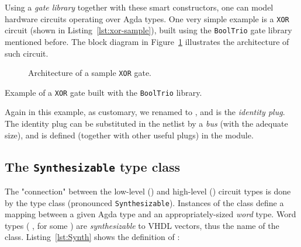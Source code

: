             Using a \emph{gate library} together with these smart constructors, one can model
            hardware circuits operating over Agda types.
            One very simple example is a \texttt{XOR} circuit (shown in Listing~\ref{lst:xor-sample}),
            built using the \texttt{BoolTrio} gate library mentioned before.
            The block diagram in Figure~\ref{fig:xor-sample} illustrates the architecture of such circuit.

            \begin{figure}[h]
                \caption{Architecture of a sample \texttt{XOR} gate.\label{fig:xor-sample}}
            \end{figure}

            \begin{listing}[h]
                \newline
                \caption{Example of a \texttt{XOR} gate built with the \texttt{BoolTrio} library.\label{lst:xor-sample}}
            \end{listing}

            Again in this example, as customary, we renamed  to ,
            and  is the \emph{identity plug}.
            The identity plug can be substituted in the netlist by a \emph{bus} (with the adequate size),
            and is defined (together with other useful plugs) in the  module.


        \subsection{The \texttt{Synthesizable} type class}
        \label{subsec:synthesizable}
            The "connection" between the low-level () and high-level () circuit types
            is done by the  type class (pronounced \texttt{Synthesizable}).
            Instances of the  class define a mapping between a given Agda type
            and an appropriately-sized \emph{word} type.
            Word types ( , for some ) are \emph{synthesizable} to \ac{VHDL} vectors,
            thus the name of the class.
            Listing~\ref{lst:Synth} shows the definition of :

